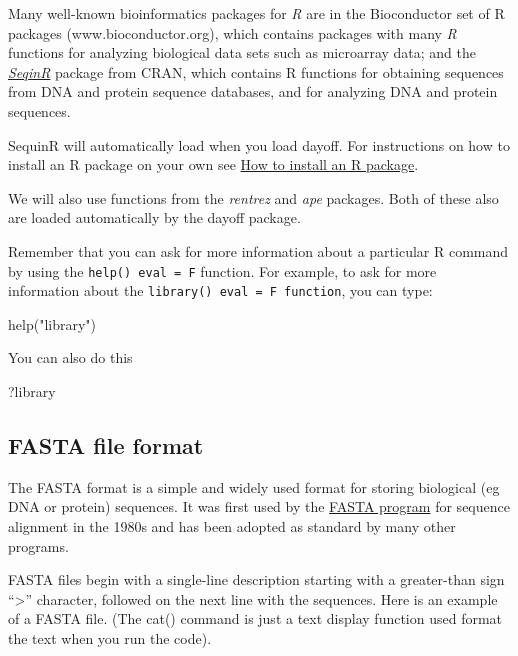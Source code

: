 \documentclass[
]{book}
\newenvironment{Shaded}{\begin{snugshade}}{\end{snugshade}}
\newcommand{\FunctionTok}[1]{\textcolor[rgb]{0.00,0.00,0.00}{#1}}
\newcommand{\NormalTok}[1]{#1}
\newcommand{\StringTok}[1]{\textcolor[rgb]{0.31,0.60,0.02}{#1}}
\begin{document}
Many well-known bioinformatics packages for \emph{R} are in the Bioconductor set of R packages (www.bioconductor.org), which contains packages with many \emph{R} functions for analyzing biological data sets such as microarray data; and the \href{https://cran.r-project.org/web/packages/seqinr/index.html}{\emph{SeqinR}} package from CRAN, which contains R functions for obtaining sequences from DNA and protein sequence databases, and for analyzing DNA and protein sequences.

SequinR will automatically load when you load dayoff. For instructions on how to install an R package on your own see \href{https://a-little-book-of-r-for-bioinformatics.readthedocs.io/en/latest/src/installr.html}{How to install an R package}.

We will also use functions from the \emph{rentrez} and \emph{ape} packages. Both of these also are loaded automatically by the dayoff package.

Remember that you can ask for more information about a particular R command by using the \texttt{help()\ eval\ =\ F} function. For example, to ask for more information about the \texttt{library()\ eval\ =\ F\ function}, you can type:

\begin{Shaded}
\begin{Highlighting}[]
\FunctionTok{help}\NormalTok{(}\StringTok{"library"}\NormalTok{)}
\end{Highlighting}
\end{Shaded}

You can also do this

\begin{Shaded}
\begin{Highlighting}[]
\NormalTok{?library}
\end{Highlighting}
\end{Shaded}

\hypertarget{fasta-file-format}{%
\subsection{FASTA file format}\label{fasta-file-format}}

The FASTA format is a simple and widely used format for storing biological (eg DNA or protein) sequences. It was first used by the \href{https://en.wikipedia.org/wiki/FASTA}{FASTA program} for sequence alignment in the 1980s and has been adopted as standard by many other programs.

FASTA files begin with a single-line description starting with a greater-than sign ``\textgreater{}'' character, followed on the next line with the sequences. Here is an example of a FASTA file. (The cat() command is just a text display function used format the text when you run the code).
\end{document}
